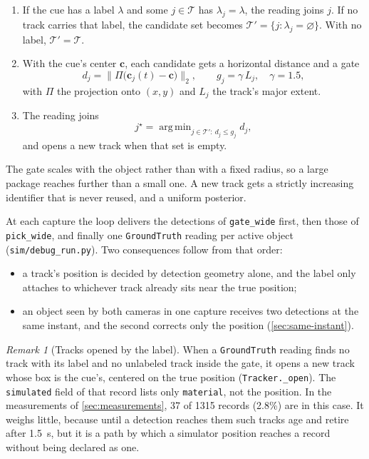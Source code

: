 \documentclass[11pt,a4paper]{article}
\theoremstyle{definition}
\theoremstyle{remark}
\newtheorem{remark}{Remark}
\newcommand{\code}[1]{\texttt{#1}}
\DeclareMathOperator*{\argmin}{arg\,min}
\begin{document}
\begin{enumerate}[leftmargin=*]
\item If the cue has a label $\lambda$ and some $j\in\mathcal T$ has
  $\lambda_j = \lambda$, the reading joins $j$. If no track carries that label,
  the candidate set becomes $\mathcal T' = \{j : \lambda_j = \varnothing\}$.
  With no label, $\mathcal T' = \mathcal T$.
\item With the cue's center $\mathbf{c}$, each candidate gets a horizontal
  distance and a gate
  \begin{equation}
  \label{eq:gate}
  d_j = \bigl\|\Pi\bigl(\mathbf{c}_j(t) - \mathbf{c}\bigr)\bigr\|_2,
  \qquad
  g_j = \gamma\,L_j,\quad \gamma = 1.5,
  \end{equation}
  with $\Pi$ the projection onto $(x,y)$ and $L_j$ the track's major extent.
\item The reading joins
  \begin{equation}
  j^\star = \argmin_{j\in\mathcal T' :\ d_j \le g_j} d_j,
  \end{equation}
  and opens a new track when that set is empty.
\end{enumerate}

The gate scales with the object rather than with a fixed radius, so a large
package reaches further than a small one. A new track gets a strictly increasing
identifier that is never reused, and a uniform posterior.

At each capture the loop delivers the detections of \code{gate\_wide} first,
then those of \code{pick\_wide}, and finally one \code{GroundTruth} reading per
active object (\code{sim/debug\_run.py}). Two consequences follow from that
order:
\begin{itemize}[leftmargin=*]
\item a track's position is decided by detection geometry alone, and the label
  only attaches to whichever track already sits near the true position;
\item an object seen by both cameras in one capture receives two detections at
  the same instant, and the second corrects only the position
  (\cref{sec:same-instant}).
\end{itemize}

\begin{remark}[Tracks opened by the label]
\label{rem:gt-track}
When a \code{GroundTruth} reading finds no track with its label and no
unlabeled track inside the gate, it opens a new track whose box is the cue's,
centered on the true position (\code{Tracker.\_open}). The \code{simulated}
field of that record lists only \code{material}, not the position. In the
measurements of \cref{sec:measurements}, 37 of 1315 records (2.8\%) are in this
case. It weighs little, because until a detection reaches them such tracks age
and retire after 1.5~s, but it is a path by which a simulator position reaches a
record without being declared as one.
\end{remark}
\end{document}

